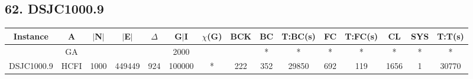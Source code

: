 \documentclass[10pt]{article}
\begin{document}
\subsection*{\hspace{0,9073976cm} 62. DSJC1000.9}
\begin{table}[H]
\centering
\begin{tabular}{|c|c|c|c|c|c|c|c|c|c|c|c|c|c|c|}
\hline
Instance& A &$|$N$|$ & $|$E$|$ & $\Delta$ & G$|$I & $\chi$(G) &BCK&BC & T:BC(s) & FC & T:FC(s) & CL & SYS & T:T(s) \\ \hline \hline

		&GA&       &                   &                     &   2000      &     \cellcolor{yellow} & {\cellcolor{yellow}}& {{\cellcolor{green}*}}
&*   &*        & *                  &*                    &*          &*       \\ \cline{2-2} \cline{6-6} \cline{9-15}
 \multirow{-2}{*}{DSJC1000.9} &HCFI   &\multirow{-2}{*}{1000}   &\multirow{-2}{*}{449449}     &\multirow{-2}{*}{924}     & 100000    &\multirow{-2}{*}{\cellcolor{yellow}*}      & \multirow{-2}{*}{\cellcolor{yellow}222}    &{\cellcolor{green}352}     &29850         &692    &119        &1656    &1     &30770        \\ \hline 
\end{tabular}
\end{table}
\begin{comment}
\graphicspath{{./Core1/Solutions/GA/DSJC1000.9.col}}
\begin{figure}[H]
\begin{subfigure}{.33\textwidth}
  \centering
  \texttt{[image: DSJC1000.9.col\\\_Algorithm\\\_analysis.png]}
  \caption{GA-Algorithm analysis}
   \label{fig:subfig1}
\end{subfigure}%
\begin{subfigure}{.33\textwidth}
  \centering
  \texttt{[image: DSJC1000.9.col\\\_Graph\\\_coloring.png]}
  \caption{GA-Graph coloring}
  \label{fig:subfig2}
\end{subfigure}
\begin{subfigure}{.33\textwidth}
  \centering
  \texttt{[image: DSJC1000.9.col\\\_Time\\\_analysis.png]}
  \caption{GA-Time analysis}
  \end{subfigure}
\end{figure}
\end{comment}
\graphicspath{{./Core1/Solutions/HCFI/DSJC1000.9.col}}
\end{document}
